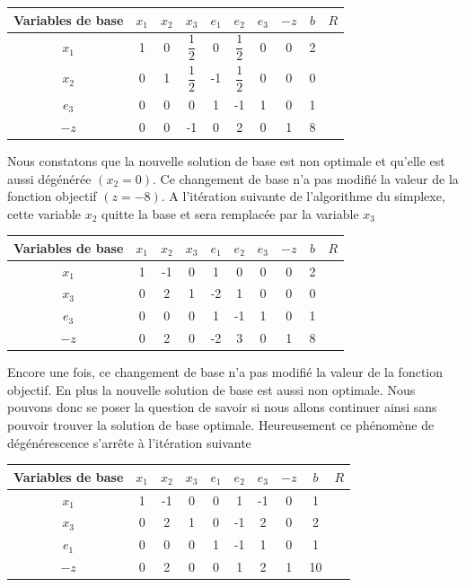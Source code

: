 \documentclass[a4paper,12pt,openany]{book}
\theoremstyle{plain}
\theoremstyle{definition}
\theoremstyle{remark}
\theoremstyle{nbstyle}
\begin{document}
	\begin{center}
		\begin{tabular}{|c|ccccccc|c|c|}
			\hline
			Variables de base & $x_{1}$ & $x_{2}$ & $x_{3}$ & $e_{1}$ & $e_{2}$ & $e_{3}$ & $-z$ & $b$ & $R$ \\
			\hline
			$x_{1}$ & 1 & 0 & $\dfrac{1}{2}$ & 0 & $\dfrac{1}{2}$ & 0 & 0 & 2 &  \\
			$x_{2}$ & 0 & 1 & $\dfrac{1}{2}$ & -1 & $\dfrac{1}{2}$ & 0 & 0 & 0 &  \\
			$e_{3}$ & 0 & 0 & 0 & 1 & -1 & 1 & 0 & 1 &  \\
			\hline
			$-z$ & 0 & 0 & -1 & 0 & 2 & 0 & 1 & 8 &  \\
			\hline
		\end{tabular}
	\end{center}
	
	Nous constatons que la nouvelle solution de base est non optimale et qu'elle est aussi dégénérée $\left(x_{2}=0\right)$. Ce changement de base n'a pas modifié la valeur de la fonction objectif $(z=-8)$. A l'itération suivante de l'algorithme du simplexe, cette variable $x_{2}$ quitte la base et sera remplacée par la variable $x_{3}$
	
	\begin{center}
		\begin{tabular}{|c|c|c|c|c|c|c|c|c|c|}
			\hline
			Variables de base & $x_{1}$ & $x_{2}$ & $x_{3}$ & $e_{1}$ & $e_{2}$ & $e_{3}$ & $-z$ & $b$ & $R$ \\
			\hline
			$x_{1}$ & 1 & -1 & 0 & 1 & 0 & 0 & 0 & 2 &  \\
			$x_{3}$ & 0 & 2 & 1 & -2 & 1 & 0 & 0 & 0 &  \\
			$e_{3}$ & 0 & 0 & 0 & 1 & -1 & 1 & 0 & 1 &  \\
			\hline
			$-z$ & 0 & 2 & 0 & -2 & 3 & 0 & 1 & 8 &  \\
			\hline
		\end{tabular}
	\end{center}
	
	Encore une fois, ce changement de base n'a pas modifié la valeur de la fonction objectif. En plus la nouvelle solution de base est aussi non optimale. Nous pouvons donc se poser la question de savoir si nous allons continuer ainsi sans pouvoir trouver la solution de base optimale. Heureusement ce phénomène de dégénérescence s'arrête à l'itération suivante
	
	\begin{center}
		\begin{tabular}{|c|c|c|c|c|c|c|c|c|c|}
			\hline
			Variables de base & $x_{1}$ & $x_{2}$ & $x_{3}$ & $e_{1}$ & $e_{2}$ & $e_{3}$ & $-z$ & $b$ & $R$ \\
			\hline
			$x_{1}$ & 1 & -1 & 0 & 0 & 1 & -1 & 0 & 1 &  \\
			$x_{3}$ & 0 & 2 & 1 & 0 & -1 & 2 & 0 & 2 &  \\
			$e_{1}$ & 0 & 0 & 0 & 1 & -1 & 1 & 0 & 1 &  \\
			$-z$ & 0 & 2 & 0 & 0 & 1 & 2 & 1 & 10 &  \\
			\hline
		\end{tabular}
	\end{center}
	
\end{document}
